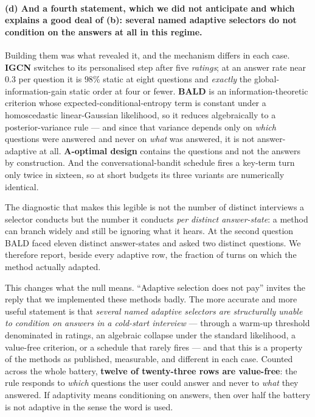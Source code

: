 \documentclass[11pt]{article}
\begin{document}
\paragraph{(d) And a fourth statement, which we did not anticipate and which explains a good deal of
(b): several named adaptive selectors do not condition on the answers at all in this regime.}
Building them was what revealed it, and the mechanism differs in each case. \textbf{IGCN} switches to
its personalised step after five \emph{ratings}; at an answer rate near $0.3$ per question it is
$98\%$ static at eight questions and \emph{exactly} the global-information-gain static order at four
or fewer. \textbf{BALD} is an information-theoretic criterion whose expected-conditional-entropy
term is constant under a homoscedastic linear-Gaussian likelihood, so it reduces algebraically to a
posterior-variance rule --- and since that variance depends only on \emph{which} questions were
answered and never on \emph{what} was answered, it is not answer-adaptive at all. \textbf{A-optimal
design} contains the questions and not the answers by construction. And the conversational-bandit
schedule fires a key-term turn only twice in sixteen, so at short budgets its three variants are
numerically identical.

The diagnostic that makes this legible is not the number of distinct interviews a selector conducts
but the number it conducts \emph{per distinct answer-state}: a method can branch widely and still be
ignoring what it hears. At the second question BALD faced eleven distinct answer-states and asked
two distinct questions. We therefore report, beside every adaptive row, the fraction of turns on
which the method actually adapted.

This changes what the null means. ``Adaptive selection does not pay'' invites the reply that we
implemented these methods badly. The more accurate and more useful statement is that \emph{several
named adaptive selectors are structurally unable to condition on answers in a cold-start interview}
--- through a warm-up threshold denominated in ratings, an algebraic collapse under the standard
likelihood, a value-free criterion, or a schedule that rarely fires --- and that this is a property
of the methods as published, measurable, and different in each case. Counted across the whole
battery, \textbf{twelve of twenty-three rows are value-free}: the rule responds to \emph{which}
questions the user could answer and never to \emph{what} they answered. If adaptivity means
conditioning on answers, then over half the battery is not adaptive in the sense the word is used.
\end{document}
